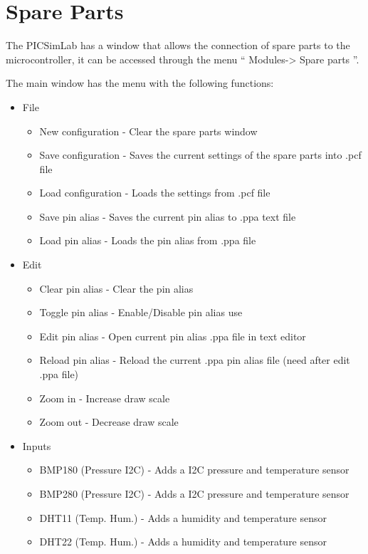 

\chapter{Spare Parts} \hypertarget{def:spare}{}

The PICSimLab has a window that allows the connection of spare parts to the microcontroller, it can be accessed through the menu `` Modules-> Spare parts ''.

The main window has the menu with the following functions:
\begin{itemize}
 \item File
 \begin{itemize}
 \item New configuration - Clear the spare parts window 
 \item Save configuration - Saves the current settings of the spare parts into .pcf file
 \item Load configuration - Loads the settings from .pcf file
 \item Save pin alias - Saves the current pin alias to .ppa text file
 \item Load pin alias - Loads the pin alias from .ppa file
\end{itemize}
 \item Edit
 \begin{itemize}
 \item Clear pin alias - Clear the pin alias 
 \item Toggle pin alias - Enable/Disable pin alias use
 \item Edit pin alias - Open current pin alias .ppa file in text editor
 \item Reload pin alias - Reload the current .ppa pin alias file (need after edit .ppa file) 
 \item Zoom in - Increase draw scale
 \item Zoom out - Decrease draw scale
\end{itemize}
 \item Inputs
 \begin{itemize}
  \item BMP180 (Pressure I2C) - Adds a I2C pressure and temperature sensor
  \item BMP280 (Pressure I2C) - Adds a I2C pressure and temperature sensor
  \item DHT11 (Temp. Hum.) - Adds a humidity and temperature sensor
  \item DHT22 (Temp. Hum.) - Adds a humidity and temperature sensor

\end{itemize}
\end{itemize}
